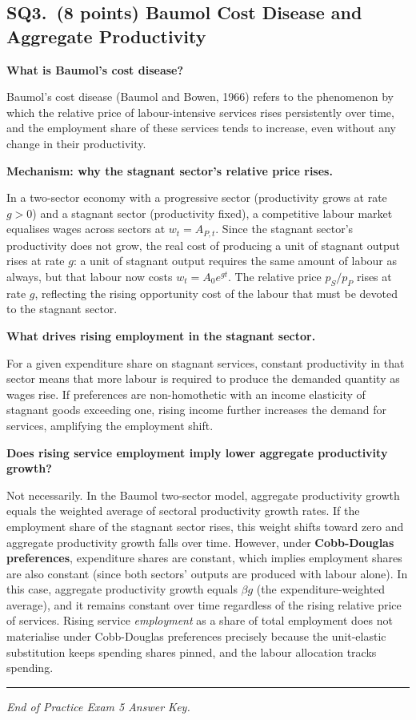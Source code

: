 \documentclass[a4paper,11pt]{article}
\begin{document}
\subsection*{SQ3.\ (8 points) Baumol Cost Disease and Aggregate Productivity}

\begin{answerbox}
\textbf{What is Baumol's cost disease?}

Baumol's cost disease (Baumol and Bowen, 1966) refers to the phenomenon by which the
relative price of labour-intensive services rises persistently over time, and the
employment share of these services tends to increase, even without any change in their
productivity.

\textbf{Mechanism: why the stagnant sector's relative price rises.}

In a two-sector economy with a progressive sector (productivity grows at rate $g > 0$)
and a stagnant sector (productivity fixed), a competitive labour market equalises wages
across sectors at $w_t = A_{P,t}$. Since the stagnant sector's productivity does not
grow, the real cost of producing a unit of stagnant output rises at rate $g$: a unit of
stagnant output requires the same amount of labour as always, but that labour now costs
$w_t = A_0 e^{gt}$. The relative price $p_S/p_P$ rises at rate $g$, reflecting the rising
opportunity cost of the labour that must be devoted to the stagnant sector.

\textbf{What drives rising employment in the stagnant sector.}

For a given expenditure share on stagnant services, constant productivity in that sector
means that more labour is required to produce the demanded quantity as wages rise. If
preferences are non-homothetic with an income elasticity of stagnant goods exceeding one,
rising income further increases the demand for services, amplifying the employment shift.

\textbf{Does rising service employment imply lower aggregate productivity growth?}

Not necessarily. In the Baumol two-sector model, aggregate productivity growth equals the
weighted average of sectoral productivity growth rates. If the employment share of the
stagnant sector rises, this weight shifts toward zero and aggregate productivity growth
falls over time. However, under \textbf{Cobb-Douglas preferences}, expenditure shares are
constant, which implies employment shares are also constant (since both sectors' outputs
are produced with labour alone). In this case, aggregate productivity growth equals
$\beta g$ (the expenditure-weighted average), and it remains constant over time regardless
of the rising relative price of services. Rising service \emph{employment} as a share of
total employment does not materialise under Cobb-Douglas preferences precisely because
the unit-elastic substitution keeps spending shares pinned, and the labour allocation
tracks spending.
\end{answerbox}

\vspace{20pt}
\noindent\rule{\textwidth}{0.4pt}

\begin{center}
    \textit{End of Practice Exam 5 Answer Key.}
\end{center}
\end{document}
